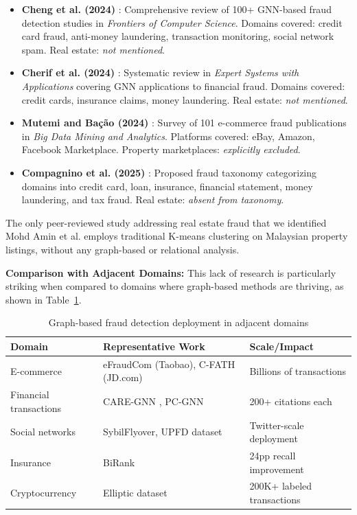 \begin{itemize}
    \item \textbf{Cheng et al. (2024)} \cite{cheng2024gnn}: Comprehensive review of 100+ GNN-based fraud detection studies in \emph{Frontiers of Computer Science}. Domains covered: credit card fraud, anti-money laundering, transaction monitoring, social network spam. Real estate: \emph{not mentioned}.
    
    \item \textbf{Cherif et al. (2024)} \cite{cherif2024financial}: Systematic review in \emph{Expert Systems with Applications} covering GNN applications to financial fraud. Domains covered: credit cards, insurance claims, money laundering. Real estate: \emph{not mentioned}.
    
    \item \textbf{Mutemi and Bação (2024)} \cite{mutemi2024ecommerce}: Survey of 101 e-commerce fraud publications in \emph{Big Data Mining and Analytics}. Platforms covered: eBay, Amazon, Facebook Marketplace. Property marketplaces: \emph{explicitly excluded}.
    
    \item \textbf{Compagnino et al. (2025)} \cite{compagnino2025taxonomy}: Proposed fraud taxonomy categorizing domains into credit card, loan, insurance, financial statement, money laundering, and tax fraud. Real estate: \emph{absent from taxonomy}.
\end{itemize}

The only peer-reviewed study addressing real estate fraud that we identified Mohd Amin et al. \cite{mohdamin2024clustering} employs traditional K-means clustering on Malaysian property listings, without any graph-based or relational analysis.

\textbf{Comparison with Adjacent Domains:} This lack of research is particularly striking when compared to domains where graph-based methods are thriving, as shown in Table~\ref{tab:adjacent_domains}.

\begin{table}[h]
\centering
\caption{Graph-based fraud detection deployment in adjacent domains}
\label{tab:adjacent_domains}
\begin{tabular}{@{}lll@{}}
\toprule
\textbf{Domain} & \textbf{Representative Work} & \textbf{Scale/Impact} \\ \midrule
E-commerce & eFraudCom (Taobao), C-FATH (JD.com) & Billions of transactions \\
Financial transactions & CARE-GNN \cite{dou2020enhancing}, PC-GNN \cite{liu2020alleviating} & 200+ citations each \\
Social networks & SybilFlyover, UPFD dataset & Twitter-scale deployment \\
Insurance & BiRank \cite{oskarsdottir2022social} & 24pp recall improvement \\
Cryptocurrency & Elliptic dataset \cite{weber2019elliptic} & 200K+ labeled transactions \\ \bottomrule
\end{tabular}
\end{table}

